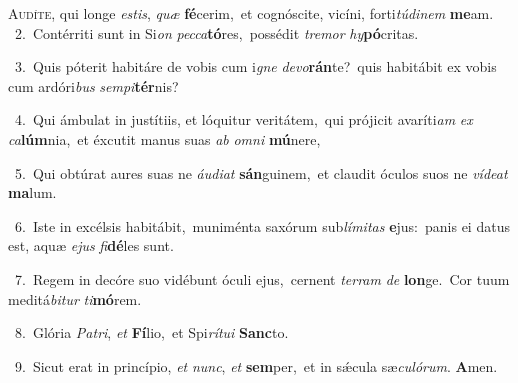 \lettrine{\initial\textcolor{\initialcolor}{A}}{udíte,} qui longe \textit{es}\-\textit{tis}, \textit{quæ} \textbf{fé}\-cerim,~\star et cognóscite, vicíni, forti\-\textit{tú}\-\textit{di}\textit{nem} \textbf{me}\-am.\\
{\numbfont\textcolor{\numbcolor}{~2.}}~Contérriti sunt in Si\textit{on} \textit{pec}\-\textit{ca}\textbf{tó}res,~\star possédit \textit{tre}\-\textit{mor} \textit{hy}\-\textbf{pó}critas.\par
{\numbfont\textcolor{\numbcolor}{~3.}}~Quis póterit habitáre de vobis cum i\textit{gne} \textit{de}\-\textit{vo}\textbf{rán}te?~\star quis habitábit ex vobis cum ardóri\textit{bus} \textit{sem}\-\textit{pi}\textbf{tér}nis?\par
{\numbfont\textcolor{\numbcolor}{~4.}}~Qui ámbulat in justítiis, et lóquitur veritátem,~\dagger qui prójicit avaríti\textit{am} \textit{ex} \textit{ca}\-\textbf{lúm}nia,~\star et éxcutit manus suas \textit{ab} \textit{om}\-\textit{ni} \textbf{mú}\-nere,\par
{\numbfont\textcolor{\numbcolor}{~5.}}~Qui obtúrat aures suas ne \textit{áu}\-\textit{di}\textit{at} \textbf{sán}\-guinem,~\star et claudit óculos suos ne \textit{ví}\-\textit{de}\textit{at} \textbf{ma}\-lum.\par
{\numbfont\textcolor{\numbcolor}{~6.}}~Iste in excélsis habitábit,~\dagger muniménta saxórum sub\-\textit{lí}\-\textit{mi}\textit{tas} \textbf{e}\-jus:~\star panis ei datus est, aquæ \textit{e}\-\textit{jus} \textit{fi}\-\textbf{dé}les sunt.\par
{\numbfont\textcolor{\numbcolor}{~7.}}~Regem in decóre suo vidébunt óculi ejus,~\dagger cernent \textit{ter}\-\textit{ram} \textit{de} \textbf{lon}\-ge.~\star Cor tuum meditá\-\textit{bi}\-\textit{tur} \textit{ti}\-\textbf{mó}rem.\par
{\numbfont\textcolor{\numbcolor}{~8.}}~Glória \textit{Pa}\-\textit{tri}, \textit{et} \textbf{Fí}\-lio,~\star et Spi\-\textit{rí}\-\textit{tu}\textit{i} \textbf{Sanc}\-to.\par
{\numbfont\textcolor{\numbcolor}{~9.}}~Sicut erat in princípio, \textit{et} \textit{nunc}\-, \textit{et} \textbf{sem}\-per,~\star et in sǽcula sæ\-\textit{cu}\-\textit{ló}\textit{rum}. \textbf{A}\-men.\par
